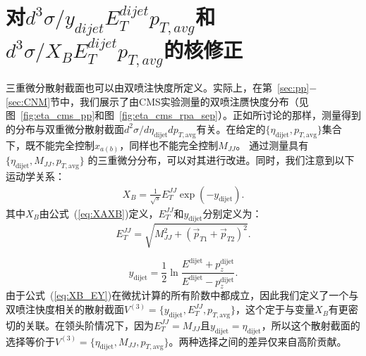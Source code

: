 
\section{对$d^3\sigma/y_{dijet}E_T^{dijet}p_{T,avg}$和$d^3\sigma/X_BE_T^{dijet}p_{T,avg}$的核修正}
\label{sec:XB_ET}

	
	三重微分散射截面也可以由双喷注快度所定义。实际上，在第~\ref{sec:pp}$-$\ref{sec:CNM}节中，我们展示了由CMS实验测量的双喷注赝快度分布（见图~\ref{fig:eta_cms_pp}和图~\ref{fig:eta_cms_rpa_sep}）。正如所讨论的那样，测量得到的分布与双重微分散射截面$d^2\sigma/d\eta_{\textrm{dijet}}dp_{T,\textrm{avg}}$有关。在给定的$\{\eta_{\textrm{dijet}},p_{T,\textrm{avg}}\}$集合下，既不能完全控制$x_{a(b)}$，同样也不能完全控制$M_{{JJ}}$。
	通过测量具有 $\{\eta_{\textrm{dijet}},M_{JJ},p_{T,\textrm{avg}}\}$ 的三重微分分布，可以对其进行改进。同时，我们注意到以下运动学关系：
	\begin{align}
	    X_B=\frac{1}{\sqrt{s}}E_T^{{\!J\!J}}\exp(-{y_{\textrm{dijet}}}).
	\label{eq:XB_EY}
	\end{align}
	其中$X_B$由公式~(\ref{eq:XAXB})定义，$E_T^{{JJ}}$和$y_{\textrm{dijet}}$分别定义为：
	\begin{equation}
	E_T^{{\!J\!J}}\! =\!\sqrt{M^2_{{\!J\!J}}\!+\!(\vec{p}_{T1}\!+\!\vec{p}_{T2})^2}.
	\label{eq:EJJY}
	\end{equation}

	\begin{equation}
		y_{\textrm{dijet}}\! =\!\frac{1}{2}\ln\frac{E^{\textrm{dijet}}\!+\!p_z^{\textrm{dijet}}}{E^{\textrm{dijet}}\!-\!p_z^{\textrm{dijet}}}.
		\label{eq:ydijet}
	\end{equation}
	由于公式~(\ref{eq:XB_EY})在微扰计算的所有阶数中都成立，因此我们定义了一个与双喷注快度相关的散射截面$V^{(3)}=\{y_{\textrm{dijet}},E_T^{{JJ}},p_{T,\textrm{avg}}\}$，这个定于与变量$X_B$有更密切的关联。在领头阶情况下，因为$E_T^{{JJ}}=M_{{JJ}}$且$y_{\textrm{dijet}}=\eta_{\textrm{dijet}}$，所以这个散射截面的选择等价于$V^{(3)}=\{\eta_{\textrm{dijet}},M_{{JJ}},p_{T,\textrm{avg}}\}$。两种选择之间的差异仅来自高阶贡献。
	
